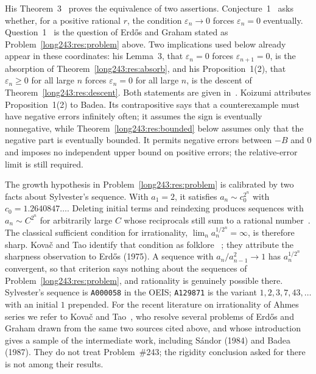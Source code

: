 His Theorem~3~\cite[pp.~12--13]{koizumi2025} proves the equivalence of
two assertions. Conjecture~1~\cite[p.~4]{koizumi2025} asks whether, for
a positive rational $r$, the condition $\varepsilon_n\to0$ forces
$\varepsilon_n=0$ eventually. Question~1~\cite[p.~3]{koizumi2025} is the
question of Erd\H{o}s and Graham stated as
Problem~\ref{long243:res:problem} above.
Two implications used below already appear in these coordinates: his Lemma~3, that $\varepsilon_n=0$ forces $\varepsilon_{n+1}=0$,
is the absorption of Theorem~\ref{long243:res:absorb}, and his Proposition~1(2), that
$\varepsilon_n\ge0$ for all large $n$ forces $\varepsilon_n=0$ for all large
$n$, is the descent of Theorem~\ref{long243:res:descent}.  Both statements are given in~\cite[Lemma~3, p.~10; Prop.~1(2), p.~14]{koizumi2025}.
Koizumi attributes Proposition~1(2) to Badea.  Its contrapositive says that a
counterexample must have negative errors infinitely often; it assumes the sign
is eventually nonnegative, while Theorem~\ref{long243:res:bounded} below assumes only
that the negative part is eventually bounded. It permits negative errors
between $-B$ and $0$ and imposes no independent upper bound on positive
errors; the relative-error limit is still required.

The growth hypothesis in Problem~\ref{long243:res:problem} is calibrated by two facts
about Sylvester's sequence. With $a_1=2$, it satisfies
$a_n\sim c_0^{2^{n}}$ with $c_0=1.2640847\ldots$. Deleting initial terms
and reindexing produces sequences with $a_n\sim C^{2^{n}}$ for arbitrarily
large $C$ whose reciprocals still sum
to a rational number~\cite[arXiv v4, p.~2]{kovactao2024}.  The classical sufficient
condition for irrationality, $\lim_n a_n^{1/2^{n}}=\infty$, is therefore
sharp.  Kova\v{c} and Tao identify that condition as folklore
~\cite[arXiv v4, p.~2]{kovactao2024}; they attribute the sharpness observation to
Erd\H{o}s (1975).  A sequence with
$a_n/a_{n-1}^{2}\to1$ has $a_n^{1/2^{n}}$
convergent, so that criterion says nothing about the sequences of
Problem~\ref{long243:res:problem}, and rationality is genuinely possible there.
Sylvester's
sequence is \texttt{A000058} in the OEIS; \texttt{A129871} is the variant
$1,2,3,7,43,\ldots$ with an initial $1$ prepended. For
the recent literature on irrationality of Ahmes series we refer to Kova\v{c}
and Tao~\cite{kovactao2024}, who resolve several problems of Erd\H{o}s and
Graham drawn from the same two sources cited above, and whose introduction
gives a sample of the intermediate work, including S\'andor (1984) and Badea
(1987).  They do not treat Problem~\#243; the rigidity conclusion asked for
there is not among their results.

